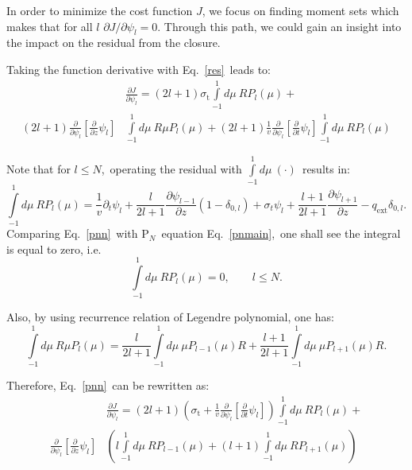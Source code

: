\documentclass[review]{elsarticle}
\newcommand{\st}{\sigma_\mathrm{t}}
\newcommand{\pn}{P$_N$}
\newcommand{\psii}[1]{\psi_\ensuremath{{#1}}}
\begin{document}
In order to minimize the cost function $J$, we focus on finding moment sets which makes that for all $l$ $\partial J/\partial\psii{l}=0$. Through this path, we could gain an insight into the impact on the residual from the closure.

Taking the function derivative with Eq.~\eqref{res}~leads to:
\begin{align}\label{func}
&\frac{\partial J}{\partial\psii{l}}=(2l+1)\st\int\limits_{-1}^{1}d\mu~RP_l(\mu)+\nonumber\\
(2l+1)\frac{\partial}{\partial\psii{l}}\left[\frac{\partial}{\partial z}\psii{l}\right]&
\int\limits_{-1}^{1}d\mu~R\mu P_l(\mu)+(2l+1)\frac{1}{v}\frac{\partial}{\partial\psii{l}}\left[\frac{\partial}{\partial t}\psii{l}\right]\int\limits_{-1}^{1}d\mu~RP_l(\mu)
\end{align}

Note that for $l\leq N$,~operating the residual with $\displaystyle\int\limits_{-1}^1d\mu~(\cdot)$~results in:
\begin{equation}\label{pnn}
\int\limits_{-1}^1d\mu~RP_l(\mu)=\frac{1}{v}\partial_t\psi_l+\frac{l}{2l+1}\frac{\partial\psi_{l-1}}{\partial z}(1-\delta_{0,l})+\sigma_{t}\psi_l+\frac{l+1}{2l+1}\frac{\partial\psi_{l+1}}{\partial z}-q_\mathrm{ext}\delta_{0,l}.
\end{equation}
Comparing Eq.~\eqref{pnn}~with \pn~equation Eq.~\eqref{pnmain},~one shall see the integral is equal to zero, i.e.
\begin{equation}\label{pnn2}
\int\limits_{-1}^1d\mu~RP_l(\mu)=0,\qquad l\leq N.
\end{equation}

Also, by using recurrence relation of Legendre polynomial, one has:
\begin{equation}\label{recurr}
\int\limits_{-1}^{1}d\mu~R\mu P_l(\mu)=\frac{l}{2l+1}\int\limits_{-1}^{1}d\mu~\mu P_{l-1}(\mu)R+\frac{l+1}{2l+1}\int\limits_{-1}^{1}d\mu~\mu P_{l+1}(\mu)R.
\end{equation}

Therefore, Eq.~\eqref{pnn}~can be rewritten as:
\begin{align}\label{func2}
&\frac{\partial J}{\partial\psii{l}}=(2l+1)\left(\st+\frac{1}{v}\frac{\partial}{\partial\psii{l}}\left[\frac{\partial}{\partial t}\psii{l}\right]\right)\int\limits_{-1}^{1}d\mu~RP_l(\mu)+\nonumber\\
\frac{\partial}{\partial\psii{l}}\left[\frac{\partial}{\partial z}\psii{l}\right]&
\left(l\int\limits_{-1}^{1}d\mu~RP_{l-1}(\mu)+(l+1)\int\limits_{-1}^{1}d\mu~RP_{l+1}(\mu)\right)
\end{align}
\end{document}
